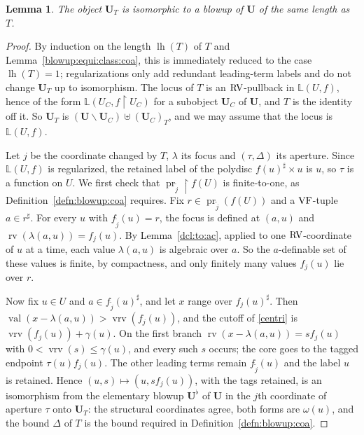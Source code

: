 \documentclass[12pt]{amsart}
\theoremstyle{plain}
\newtheorem{lem}[thm]{Lemma}
\theoremstyle{definition}
\theoremstyle{remark}
\numberwithin{equation}{section}
\theoremstyle{plain}
\newcommand{\VF}{\textup{VF}}
\newcommand{\RV}{\textup{RV}}
\DeclareMathOperator{\lh}{lh}
\DeclareMathOperator{\pr}{pr}
\newcommand{\0}{\emptyset}
\newcommand{\bb}[1]{\mathbb{#1}}
\newcommand{\rest}{\upharpoonright}
\newcommand{\efun}{\longmapsto}
\newcommand{\mi}{\smallsetminus}
\DeclareMathOperator{\rv}{rv}
\DeclareMathOperator{\vv}{val}
\DeclareMathOperator{\vrv}{vrv}
\begin{document}
\begin{lem}\label{special:to:blowup:coa}
The object $\bm U_T$ is isomorphic to a blowup of $\bm U$ of the same length as $T$.
\end{lem}
\begin{proof}
By induction on the length $\lh (T)$ of $T$ and Lemma~\ref{blowup:equi:class:coa}, this is immediately reduced to the case $\lh (T) = 1$; regularizations only add redundant leading-term labels and do not change $\bm U_T$ up to isomorphism. The locus of $T$ is an $\RV$-pullback in $\bb L(U, f)$, hence of the form $\bb L(U_C, f \rest U_C)$ for a subobject $\bm U_C$ of $\bm U$, and $T$ is the identity off it. So $\bm U_T$ is $(\bm U \mi \bm U_C) \uplus (\bm U_C)_T$, and we may assume that the locus is $\bb L(U, f)$.

Let $j$ be the coordinate changed by $T$, $\lambda$ its focus and $(\tau, \Delta)$ its aperture. Since $\bb L(U, f)$ is regularized, the retained label of the polydisc $f(u)^\sharp \times u$ is $u$, so $\tau$ is a function on $U$. We first check that $\pr_{\tilde j} \rest f(U)$ is finite-to-one, as Definition~\ref{defn:blowup:coa} requires. Fix $r \in \pr_{\tilde j}(f(U))$ and a $\VF$-tuple $a \in r^\sharp$. For every $u$ with $f_{\tilde j}(u) = r$, the focus is defined at $(a, u)$ and $\rv(\lambda(a, u)) = f_j(u)$. By Lemma~\ref{dcl:to:ac}, applied to one $\RV$-coordinate of $u$ at a time, each value $\lambda(a, u)$ is algebraic over $a$. So the $a$-definable set of these values is finite, by compactness, and only finitely many values $f_j(u)$ lie over $r$.

Now fix $u \in U$ and $a \in f_{\tilde j}(u)^\sharp$, and let $x$ range over $f_j(u)^\sharp$. Then $\vv(x - \lambda(a, u)) > \vrv(f_j(u))$, and the cutoff of \eqref{centri} is $\vrv(f_j(u)) + \gamma(u)$. On the first branch $\rv(x - \lambda(a, u)) = s f_j(u)$ with $0 < \vrv(s) \leq \gamma(u)$, and every such $s$ occurs; the core goes to the tagged endpoint $\tau(u) f_j(u)$. The other leading terms remain $f_{\tilde j}(u)$ and the label $u$ is retained. Hence $(u, s) \efun (u, s f_j(u))$, with the tags retained, is an isomorphism from the elementary blowup $\bm U^\flat$ of $\bm U$ in the $j$th coordinate of aperture $\tau$ onto $\bm U_T$: the structural coordinates agree, both forms are $\omega(u)$, and the bound $\Delta$ of $T$ is the bound required in Definition~\ref{defn:blowup:coa}.
\end{proof}
\end{document}
